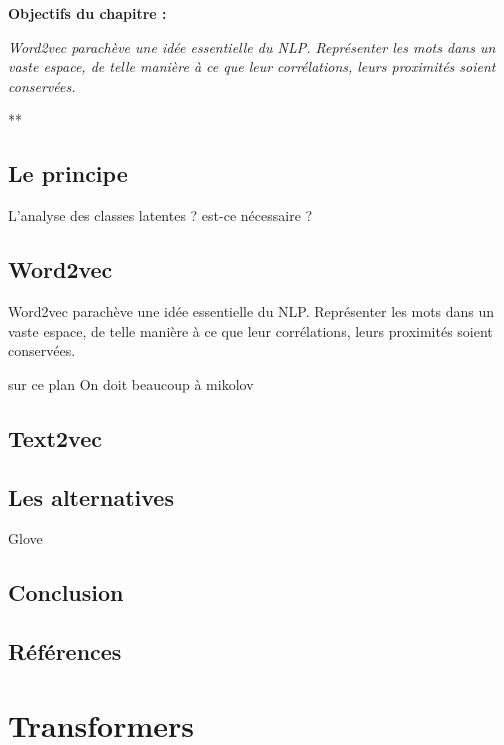 \documentclass[
  letterpaper,
  DIV=11,
  numbers=noendperiod]{scrreprt}
\begin{document}
\textbf{Objectifs du chapitre :}

\emph{Word2vec parachève une idée essentielle du NLP. Représenter les
mots dans un vaste espace, de telle manière à ce que leur corrélations,
leurs proximités soient conservées.}

**

\section{Le principe}\label{le-principe}

L'analyse des classes latentes ? est-ce nécessaire ?

\section{Word2vec}\label{word2vec}

Word2vec parachève une idée essentielle du NLP. Représenter les mots
dans un vaste espace, de telle manière à ce que leur corrélations, leurs
proximités soient conservées.

sur ce plan On doit beaucoup à mikolov

\section{Text2vec}\label{text2vec}

\section{Les alternatives}\label{les-alternatives}

Glove

\section{Conclusion}\label{conclusion-10}

\section{Références}\label{ruxe9fuxe9rences-2}


\chapter{Transformers}\label{transformers}
\end{document}
